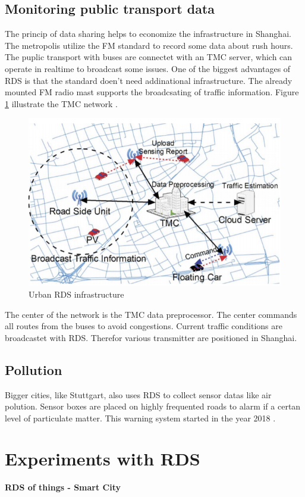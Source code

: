 \documentclass[conference,12pt,a4paper]{IEEEtran}
\begin{document}
	
	\subsection{Monitoring public transport data}
	
	The princip of data sharing helps to economize the infrastructure in Shanghai. The metropolis utilize the FM standard to record some data about rush hours. The puplic transport with buses are connectet with an TMC server, which can operate in realtime to broadcast some issues. One of the biggest advantages of RDS is that the standard doen't need addinational infrastructure. The already mounted FM radio mast supports the broadcsating of traffic information. Figure \ref{fig: monitoring} illustrate the TMC network \cite{Monitoring-du2014effective}.
	
	\begin{figure}[h]
		\centering
		\includegraphics[width =0.7\linewidth]{img/monitoring}
		\caption{Urban RDS infrastructure}
		\label{fig: monitoring}
	\end{figure}
	
	The center of the network is the TMC data preprocessor. The center commands all routes from the buses to avoid congestions. Current traffic conditions are broadcastet with RDS. Therefor various transmitter are positioned in Shanghai.

	
	\subsection{Pollution}
	
	Bigger cities, like Stuttgart, also uses RDS to collect sensor datas like air polution. Sensor boxes are placed on highly frequented roads to alarm if a certan level of particulate matter. This warning system started in the year 2018 \cite{Stuttgart}.\\			 
	
	
	\section{Experiments with RDS} %
	\textbf{RDS of things - Smart City}
	
\end{document}
